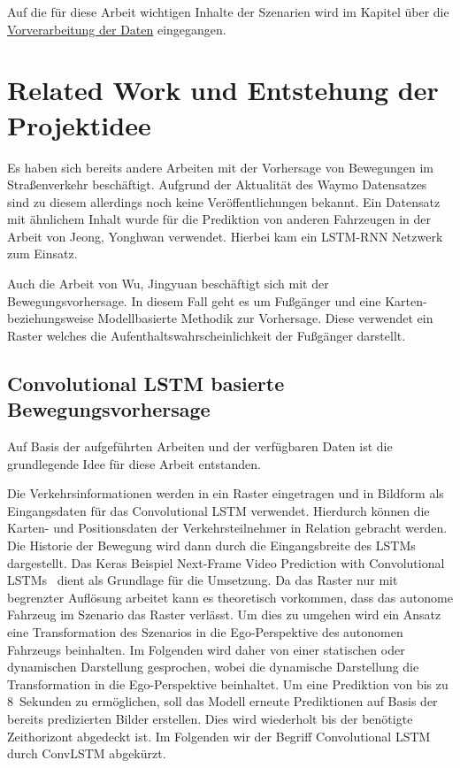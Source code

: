 \documentclass[12pt]{article}
\begin{document}
        Auf die für diese Arbeit wichtigen Inhalte der Szenarien wird im Kapitel über die \hyperref[sec:preprocessing]{Vorverarbeitung der Daten} eingegangen.

\newpage

\section{Related Work und Entstehung der Projektidee}
    Es haben sich bereits andere Arbeiten mit der Vorhersage von Bewegungen im Straßenverkehr beschäftigt. 
    Aufgrund der Aktualität des Waymo Datensatzes sind zu diesem allerdings noch keine Veröffentlichungen bekannt. 
    Ein Datensatz mit ähnlichem Inhalt wurde für die Prediktion von anderen Fahrzeugen in der Arbeit von Jeong, Yonghwan verwendet. 
    Hierbei kam ein LSTM-RNN Netzwerk zum Einsatz.~\cite{Yonghwan2020}
    
    Auch die Arbeit von Wu, Jingyuan beschäftigt sich mit der Bewegungsvorhersage. 
    In diesem Fall geht es um Fußgänger und eine Karten- beziehungsweise Modellbasierte Methodik zur Vorhersage. 
    Diese verwendet ein Raster welches die Aufenthaltswahrscheinlichkeit der Fußgänger darstellt.~\cite{Jingyuan2018}

    \subsection{Convolutional LSTM basierte Bewegungsvorhersage}
    Auf Basis der aufgeführten Arbeiten und der verfügbaren Daten ist die grundlegende Idee für diese Arbeit entstanden. 
    
    Die Verkehrsinformationen werden in ein Raster eingetragen und in Bildform als Eingangsdaten für das Convolutional LSTM verwendet.
    Hierdurch können die Karten- und Positionsdaten der Verkehrsteilnehmer in Relation gebracht werden. 
    Die Historie der Bewegung wird dann durch die Eingangsbreite des LSTMs dargestellt. 
    Das Keras Beispiel \grqq Next-Frame Video Prediction with Convolutional LSTMs\grqq ~\cite{Keras2021} dient als Grundlage für die Umsetzung.
    Da das Raster nur mit begrenzter Auflösung arbeitet kann es theoretisch vorkommen, dass das autonome Fahrzeug 
    im Szenario das Raster verlässt. Um dies zu umgehen wird ein Ansatz eine Transformation des Szenarios in die Ego-Perspektive des autonomen Fahrzeugs beinhalten. 
    Im Folgenden wird daher von einer statischen oder dynamischen Darstellung gesprochen, wobei die dynamische Darstellung die Transformation in die Ego-Perspektive beinhaltet. 
    Um eine Prediktion von bis zu 8~Sekunden zu ermöglichen, soll das Modell erneute Prediktionen auf Basis der bereits predizierten Bilder erstellen. 
    Dies wird wiederholt bis der benötigte Zeithorizont abgedeckt ist. Im Folgenden wir der Begriff Convolutional LSTM durch ConvLSTM abgekürzt.
\end{document}
